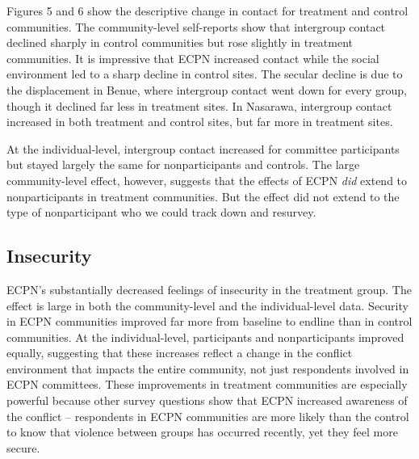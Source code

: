 \documentclass[11pt]{article}
\begin{document}
Figures 5 and 6 show the descriptive change in contact for treatment and
control communities. The community-level self-reports show that
intergroup contact declined sharply in control communities but rose
slightly in treatment communities. It is impressive that ECPN increased
contact while the social environment led to a sharp decline in control
sites. The secular decline is due to the displacement in Benue, where
intergroup contact went down for every group, though it declined far
less in treatment sites. In Nasarawa, intergroup contact increased in
both treatment and control sites, but far more in treatment sites.

At the individual-level, intergroup contact increased for committee
participants but stayed largely the same for nonparticipants and
controls. The large community-level effect, however, suggests that the
effects of ECPN \emph{did} extend to nonparticipants in treatment
communities. But the effect did not extend to the type of nonparticipant
who we could track down and resurvey.

\hypertarget{insecurity}{%
\subsection{Insecurity}\label{insecurity}}

ECPN's substantially decreased feelings of insecurity in the treatment
group. The effect is large in both the community-level and the
individual-level data. Security in ECPN communities improved far more
from baseline to endline than in control communities. At the
individual-level, participants and nonparticipants improved equally,
suggesting that these increases reflect a change in the conflict
environment that impacts the entire community, not just respondents
involved in ECPN committees. These improvements in treatment communities
are especially powerful because other survey questions show that ECPN
increased awareness of the conflict -- respondents in ECPN communities
are more likely than the control to know that violence between groups
has occurred recently, yet they feel more secure.
\end{document}
